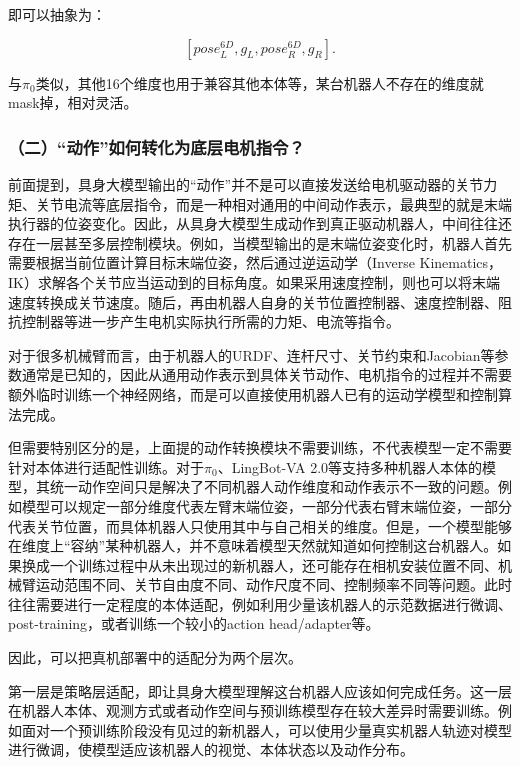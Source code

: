 即可以抽象为：

\[
[\mathit{pose}^{6D}_L,g_L,\mathit{pose}^{6D}_R,g_R].
\]

与\(\pi_0\)类似，其他16个维度也用于兼容其他本体等，某台机器人不存在的维度就mask掉，相对灵活。

\hypertarget{ux4e8cux52a8ux4f5cux5982ux4f55ux8f6cux5316ux4e3aux5e95ux5c42ux7535ux673aux6307ux4ee4}{%
\subsubsection{（二）``动作''如何转化为底层电机指令？}\label{ux4e8cux52a8ux4f5cux5982ux4f55ux8f6cux5316ux4e3aux5e95ux5c42ux7535ux673aux6307ux4ee4}}

前面提到，具身大模型输出的``动作''并不是可以直接发送给电机驱动器的关节力矩、关节电流等底层指令，而是一种相对通用的中间动作表示，最典型的就是末端执行器的位姿变化。因此，从具身大模型生成动作到真正驱动机器人，中间往往还存在一层甚至多层控制模块。例如，当模型输出的是末端位姿变化时，机器人首先需要根据当前位置计算目标末端位姿，然后通过逆运动学（Inverse Kinematics，IK）求解各个关节应当运动到的目标角度。如果采用速度控制，则也可以将末端速度转换成关节速度。随后，再由机器人自身的关节位置控制器、速度控制器、阻抗控制器等进一步产生电机实际执行所需的力矩、电流等指令。

对于很多机械臂而言，由于机器人的URDF、连杆尺寸、关节约束和Jacobian等参数通常是已知的，因此从通用动作表示到具体关节动作、电机指令的过程并不需要额外临时训练一个神经网络，而是可以直接使用机器人已有的运动学模型和控制算法完成。

但需要特别区分的是，上面提的动作转换模块不需要训练，不代表模型一定不需要针对本体进行适配性训练。对于\(\pi_0\)、LingBot-VA 2.0等支持多种机器人本体的模型，其统一动作空间只是解决了不同机器人动作维度和动作表示不一致的问题。例如模型可以规定一部分维度代表左臂末端位姿，一部分代表右臂末端位姿，一部分代表关节位置，而具体机器人只使用其中与自己相关的维度。但是，一个模型能够在维度上``容纳''某种机器人，并不意味着模型天然就知道如何控制这台机器人。如果换成一个训练过程中从未出现过的新机器人，还可能存在相机安装位置不同、机械臂运动范围不同、关节自由度不同、动作尺度不同、控制频率不同等问题。此时往往需要进行一定程度的本体适配，例如利用少量该机器人的示范数据进行微调、post-training，或者训练一个较小的action head/adapter等。

因此，可以把真机部署中的适配分为两个层次。

第一层是策略层适配，即让具身大模型理解这台机器人应该如何完成任务。这一层在机器人本体、观测方式或者动作空间与预训练模型存在较大差异时需要训练。例如面对一个预训练阶段没有见过的新机器人，可以使用少量真实机器人轨迹对模型进行微调，使模型适应该机器人的视觉、本体状态以及动作分布。

